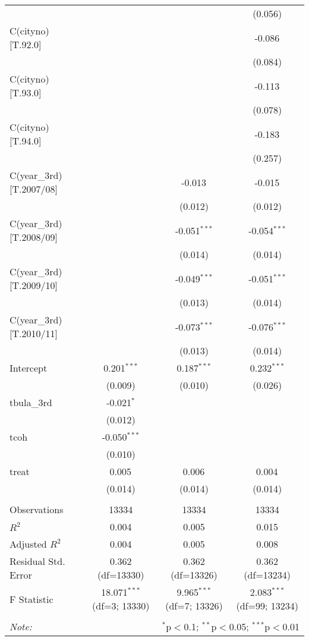 \begin{table}[!htbp]
\begin{tabular}{@{\extracolsep{5pt}}lccc}
& & & (0.056) \\
 C(cityno)[T.92.0] & & & -0.086$^{}$ \\
& & & (0.084) \\
 C(cityno)[T.93.0] & & & -0.113$^{}$ \\
& & & (0.078) \\
 C(cityno)[T.94.0] & & & -0.183$^{}$ \\
& & & (0.257) \\
 C(year_3rd)[T.2007/08] & & -0.013$^{}$ & -0.015$^{}$ \\
& & (0.012) & (0.012) \\
 C(year_3rd)[T.2008/09] & & -0.051$^{***}$ & -0.054$^{***}$ \\
& & (0.014) & (0.014) \\
 C(year_3rd)[T.2009/10] & & -0.049$^{***}$ & -0.051$^{***}$ \\
& & (0.013) & (0.014) \\
 C(year_3rd)[T.2010/11] & & -0.073$^{***}$ & -0.076$^{***}$ \\
& & (0.013) & (0.014) \\
 Intercept & 0.201$^{***}$ & 0.187$^{***}$ & 0.232$^{***}$ \\
& (0.009) & (0.010) & (0.026) \\
 tbula_3rd & -0.021$^{*}$ & & \\
& (0.012) & & \\
 tcoh & -0.050$^{***}$ & & \\
& (0.010) & & \\
 treat & 0.005$^{}$ & 0.006$^{}$ & 0.004$^{}$ \\
& (0.014) & (0.014) & (0.014) \\
\hline \\[-1.8ex]
 Observations & 13334 & 13334 & 13334 \\
 $R^2$ & 0.004 & 0.005 & 0.015 \\
 Adjusted $R^2$ & 0.004 & 0.005 & 0.008 \\
 Residual Std. Error & 0.362 (df=13330) & 0.362 (df=13326) & 0.362 (df=13234) \\
 F Statistic & 18.071$^{***}$ (df=3; 13330) & 9.965$^{***}$ (df=7; 13326) & 2.083$^{***}$ (df=99; 13234) \\
\hline
\hline \\[-1.8ex]
\textit{Note:} & \multicolumn{3}{r}{$^{*}$p$<$0.1; $^{**}$p$<$0.05; $^{***}$p$<$0.01} \\
\end{tabular}
\end{table}

